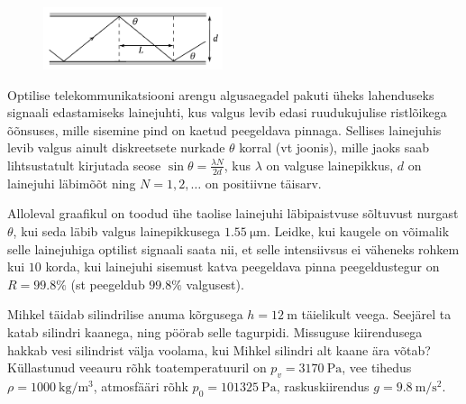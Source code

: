 \documentclass[10pt]{article}
\begin{document}

\begin{figure}
  \begin{center}
		\vspace{-15pt}
		\includegraphics[width=0.47\textwidth]{2021-v2g-08-yl.pdf}
		\vspace{-35pt}
  \end{center}
\end{figure}
Optilise telekommunikatsiooni arengu algusaegadel pakuti üheks lahenduseks signaali edastamiseks lainejuhti, kus valgus levib edasi ruudukujulise ristlõikega õõnsuses, mille sisemine pind on kaetud peegeldava pinnaga. Sellises lainejuhis levib valgus ainult diskreetsete nurkade $\theta$ korral (vt joonis), mille jaoks saab lihtsustatult kirjutada seose $\sin\theta=\tfrac{\lambda N}{2d}$, kus $\lambda$ on valguse lainepikkus, $d$ on lainejuhi läbimõõt ning $N=1,2,\dots$ on positiivne täisarv.

Alloleval graafikul on toodud ühe taolise lainejuhi läbipaistvuse sõltuvust nurgast $\theta$, kui seda läbib valgus lainepikkusega $\SI{1.55}{\micro\m}$. Leidke, kui kaugele on võimalik selle lainejuhiga optilist signaali saata nii, et selle intensiivsus ei väheneks rohkem kui $10$ korda, kui lainejuhi sisemust katva peegeldava pinna peegeldustegur on $R=99.8\%$ (st peegeldub $99.8\%$ valgusest).

\begin{figure}[H]
	\centering
	
	\vspace{-45pt}
\end{figure}
\probend
\bigskip


Mihkel täidab silindrilise anuma kõrgusega $h = \SI{12}{\m}$ täielikult veega. Seejärel ta katab silindri kaanega, ning pöörab selle tagurpidi. Missuguse kiirendusega hakkab vesi silindrist välja voolama, kui Mihkel silindri alt kaane ära võtab? Küllastunud veeauru rõhk toatemperatuuril on $p_v = \SI{3170}{\Pa}$, vee tihedus $\rho = \SI{1000}{\kg\per\m\cubed}$, atmosfääri rõhk $p_0 = \SI{101325}{\Pa}$, raskuskiirendus $g = \SI{9.8}{\m\per\s\squared}$.
\probend
\bigskip
\end{document}
